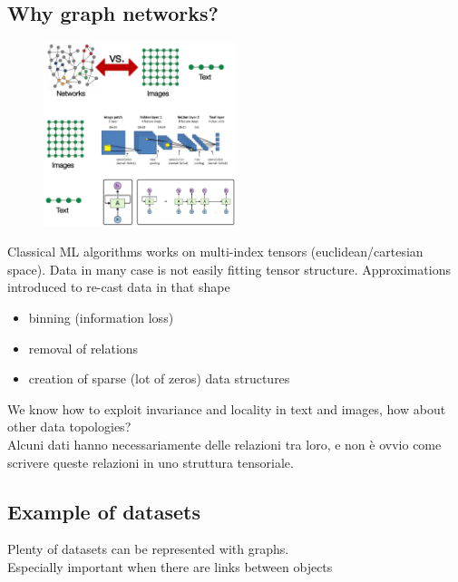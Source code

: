 \subsection{Why graph networks?}

\begin{figure}
	\includegraphics[width=0.5\textwidth]{figure_ml/graph_nets.png}
\end{figure} 

Classical ML algorithms works on multi-index
tensors (euclidean/cartesian space). Data in many case is not easily fitting tensor structure. Approximations introduced to re-cast data in that shape
\begin{itemize}
	\item binning (information loss)
	\item removal of relations
	\item creation of sparse (lot of zeros) data structures
\end{itemize}

We know how to exploit invariance and
locality in text and images, how about other
data topologies?\\
Alcuni dati hanno necessariamente delle relazioni tra loro, e non è ovvio come scrivere queste relazioni in uno struttura tensoriale.

\subsection{Example of datasets}

Plenty of datasets can be represented with graphs.\\
Especially important when there are links between objects

